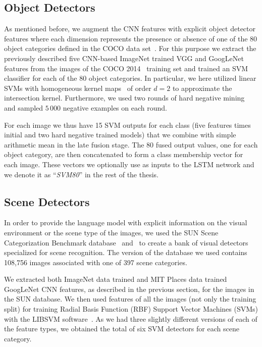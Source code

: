\subsection{Object Detectors}
\label{subsec:svm80}

As mentioned before,  we augment the CNN features with explicit object detector
features where each dimension represents the presence or absence of one of the
80 object categories defined in the COCO data set~\cite{Lin2014}.
For this purpose we extract the previously described five CNN-based ImageNet
trained VGG and GoogLeNet features from the images of the COCO
2014~\cite{Lin2014} training set and trained an SVM classifier for each of the
80 object categories.
In particular, we here utilized linear SVMs with homogeneous kernel
maps~\cite{Vedaldi2010} of order $d=2$ to approximate the intersection kernel.
Furthermore, we used two rounds of hard negative mining~\cite{Li2013} and
sampled $5\,000$ negative examples on each round.

For each image we thus have 15 SVM outputs for each class (five features times
initial and two hard negative trained models) that we combine with simple
arithmetic mean in the late fusion stage.
The 80 fused output values, one for each object category, are then concatenated
to form a class membership vector for each image.
These vectors we optionally use as inputs to the LSTM network and we denote it
as ``\emph{SVM80}'' in the rest of the thesis.

\subsection{Scene Detectors}

In order to provide the language model with explicit information on the visual
environment or the scene type of the images, we used the SUN Scene
Categorization Benchmark database~\cite{Xiao2010} and~\cite{Xiao2014} to create
a bank of visual detectors specialized for scene recognition.
The version of the database we used contains 108,756 images associated with one
of 397 scene categories.

We extracted both ImageNet data trained and MIT Places data trained GoogLeNet
CNN features, as described in the previous section, for the images in the SUN
database.
We then used features of all the images (not only the training split) for
training Radial Basis Function (RBF) Support Vector Machines (SVMs) with the
LIBSVM software~\cite{LIBSVM}.
As we had three slightly different versions of each of the feature types, we
obtained the total of six SVM detectors for each scene category.

